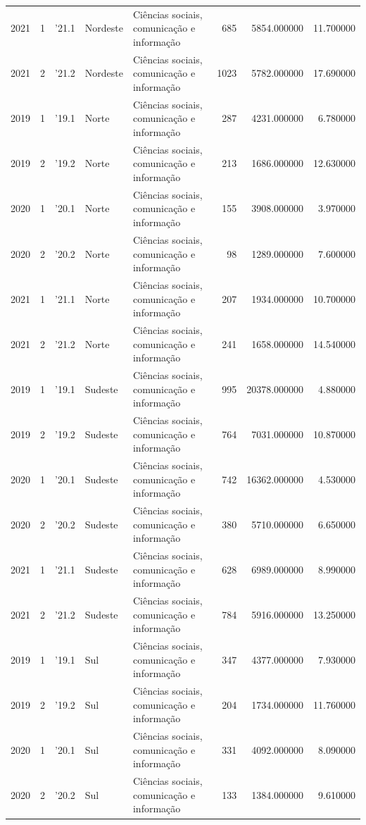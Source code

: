 \begin{longtable}{rrlllrrr}
2021 & 1 & '21.1 & Nordeste & Ciências sociais, comunicação e informação & 685 & 5854.000000 & 11.700000 \\
2021 & 2 & '21.2 & Nordeste & Ciências sociais, comunicação e informação & 1023 & 5782.000000 & 17.690000 \\
2019 & 1 & '19.1 & Norte & Ciências sociais, comunicação e informação & 287 & 4231.000000 & 6.780000 \\
2019 & 2 & '19.2 & Norte & Ciências sociais, comunicação e informação & 213 & 1686.000000 & 12.630000 \\
2020 & 1 & '20.1 & Norte & Ciências sociais, comunicação e informação & 155 & 3908.000000 & 3.970000 \\
2020 & 2 & '20.2 & Norte & Ciências sociais, comunicação e informação & 98 & 1289.000000 & 7.600000 \\
2021 & 1 & '21.1 & Norte & Ciências sociais, comunicação e informação & 207 & 1934.000000 & 10.700000 \\
2021 & 2 & '21.2 & Norte & Ciências sociais, comunicação e informação & 241 & 1658.000000 & 14.540000 \\
2019 & 1 & '19.1 & Sudeste & Ciências sociais, comunicação e informação & 995 & 20378.000000 & 4.880000 \\
2019 & 2 & '19.2 & Sudeste & Ciências sociais, comunicação e informação & 764 & 7031.000000 & 10.870000 \\
2020 & 1 & '20.1 & Sudeste & Ciências sociais, comunicação e informação & 742 & 16362.000000 & 4.530000 \\
2020 & 2 & '20.2 & Sudeste & Ciências sociais, comunicação e informação & 380 & 5710.000000 & 6.650000 \\
2021 & 1 & '21.1 & Sudeste & Ciências sociais, comunicação e informação & 628 & 6989.000000 & 8.990000 \\
2021 & 2 & '21.2 & Sudeste & Ciências sociais, comunicação e informação & 784 & 5916.000000 & 13.250000 \\
2019 & 1 & '19.1 & Sul & Ciências sociais, comunicação e informação & 347 & 4377.000000 & 7.930000 \\
2019 & 2 & '19.2 & Sul & Ciências sociais, comunicação e informação & 204 & 1734.000000 & 11.760000 \\
2020 & 1 & '20.1 & Sul & Ciências sociais, comunicação e informação & 331 & 4092.000000 & 8.090000 \\
2020 & 2 & '20.2 & Sul & Ciências sociais, comunicação e informação & 133 & 1384.000000 & 9.610000 \\

\end{longtable}
